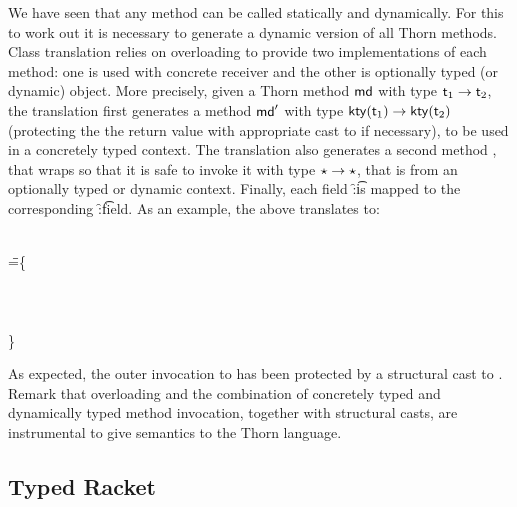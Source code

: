 \documentclass[acmsmall, anonymous, authordraft, review]{acmart} %
\newcommand{\FZ}[1]{\textbf{FZ: #1}}
\begin{document}
We have seen that any method can be called statically and dynamically. For
this to work out it is necessary to generate a dynamic version of all Thorn
methods.  Class translation relies on overloading to provide two
implementations of each method: one is used with concrete receiver
and the other is
optionally typed (or dynamic) object.  More precisely, given a Thorn method
\(\md\) with type \(\t[1] \to \t[2]\), the \kafka translation first
generates a method \(\mdp\) with type \(\kty{\t[1]} \to \kty{\t[2]}\)
(protecting the the return value with appropriate cast to \kty{\t[2]} if
necessary), to be used in a concretely typed context.  The \kafka
translation also generates a second method \mdpp, that wraps \mdp so that it
is safe to invoke it with type \(\star \to \star\), that is from an optionally
typed or dynamic context.  Finally, each field \f:\t is mapped to the
corresponding \f:\kty\t field.  As an example, the above translates to:

\begin{tabbing}
  \HS
  \KCall{\New \A{}}\n{\SubCast\C{(\KCall{\New\A{}}\m{\SubCast\any{\New\C{}}}\any\any)}}\C\C\
  \\ \HS\HS\HS\HS\HS\HS\HS\HS\HS\HS\HS\HS\HS\HS\HS\HS\HS\HS\HS\HS\HS\HS\HS\HS\HS\HS\HS\HS\HS\HS\HS\HS
\WHERE\HS \K=\HS\=
 \class\= \A \{\\
\>\HS    \Mdef \m\x\any \any{~\x~}\\
\>\HS    \Mdef \n\x\C\C{~\x~}\\
\>\HS    \Mdef \n\x\any\any {\SubCast\any{\KCall\this\n{\SubCast\C\x}\C\C }} \\
\>\}
 \end{tabbing}
\medskip

\noindent As expected, the outer invocation to \n has been protected by a
structural cast to \C.  Remark that \kafka overloading and the combination
of concretely typed and dynamically typed method invocation, together with
structural casts, are instrumental to give semantics to the Thorn language.


 


\subsection{Typed Racket}
\end{document}

